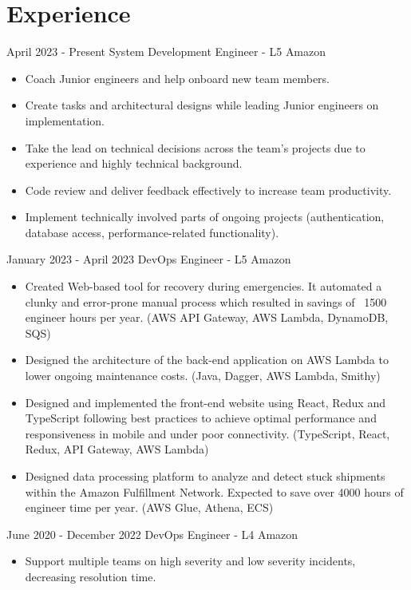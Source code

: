 \documentclass[]{friggeri-cv}
\begin{document}
\section{Experience}
\begin{entrylist}
  \entry
    {April 2023 - Present}
    {System Development Engineer - L5}
    {Amazon}
    {\begin{itemize}
        \item Coach Junior engineers and help onboard new team members.
        \item Create tasks and architectural designs while leading Junior engineers on implementation.
        \item Take the lead on technical decisions across the team's projects due to experience and highly technical background.
        \item Code review and deliver feedback effectively to increase team productivity.
        \item Implement technically involved parts of ongoing projects (authentication, database access, performance-related functionality).
    \end{itemize}}
  \entry
    {January 2023 - April 2023}
    {DevOps Engineer - L5}
    {Amazon}
    {\begin{itemize}
        \item Created Web-based tool for recovery during emergencies. It automated a clunky and error-prone manual process which resulted in savings of ~1500 engineer hours per year. (AWS API Gateway, AWS Lambda, DynamoDB, SQS)
        \item Designed the architecture of the back-end application on AWS Lambda to lower ongoing maintenance costs. (Java, Dagger, AWS Lambda, Smithy)
        \item Designed and implemented the front-end website using React, Redux and TypeScript following best practices to achieve optimal performance and responsiveness in mobile and under poor connectivity. (TypeScript, React, Redux, API Gateway, AWS Lambda)
        \item Designed data processing platform to analyze and detect stuck shipments within the Amazon Fulfillment Network. Expected to save over 4000 hours of engineer time per year. (AWS Glue, Athena, ECS)
    \end{itemize}}
  \entry
    {June 2020 - December 2022}
    {DevOps Engineer - L4}
    {Amazon}
    {\begin{itemize}
        \item Support multiple teams on high severity and low severity incidents, decreasing resolution time.

\end{itemize}}
\end{entrylist}
\end{document}
